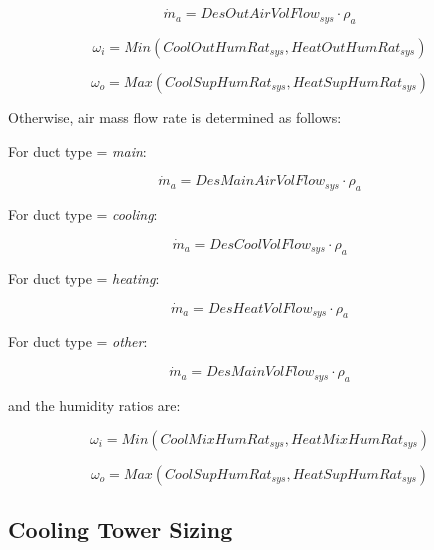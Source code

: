\begin{equation}
{\dot m_a} = DesOutAirVolFlo{w_{sys}} \cdot {\rho_a}
\end{equation}

\begin{equation}
{\omega_i} = Min\left( {CoolOutHumRa{t_{sys}},HeatOutHumRa{t_{sys}}} \right)
\end{equation}

\begin{equation}
  {\omega_o} = Max\left( {CoolSupHumRa{t_{sys}},HeatSupHumRa{t_{sys}}} \right)
\end{equation}

Otherwise, air mass flow rate is determined as follows:

For duct type = \emph{main}:

\begin{equation}
{\dot m_a} = DesMainAirVolFlo{w_{sys}} \cdot {\rho_a}
\end{equation}

For duct type = \emph{cooling}:

\begin{equation}
{\dot m_a} = DesCoolVolFlo{w_{sys}} \cdot {\rho_a}
\end{equation}

For duct type = \emph{heating}:

\begin{equation}
{\dot m_a} = DesHeatVolFlo{w_{sys}} \cdot {\rho_a}
\end{equation}

For duct type = \emph{other}:

\begin{equation}
{\dot m_a} = DesMainVolFlo{w_{sys}} \cdot {\rho_a}
\end{equation}

and the humidity ratios are:

\begin{equation}
{\omega_i} = Min\left( {CoolMixHumRa{t_{sys}},HeatMixHumRa{t_{sys}}} \right)
\end{equation}

\begin{equation}
  {\omega_o} = Max\left( {CoolSupHumRa{t_{sys}},HeatSupHumRa{t_{sys}}} \right)
\end{equation}

\subsection{Cooling Tower Sizing}\label{cooling-tower-sizing}

